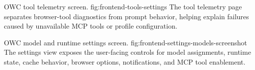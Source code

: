   {OWC tool telemetry screen.}
  {fig:frontend-tools-settings}
  {The tool telemetry page separates browser-tool diagnostics from prompt behavior, helping
  explain failures caused by unavailable MCP tools or profile configuration.}

  {OWC model and runtime settings screen.}
  {fig:frontend-settings-models-screenshot}
  {The settings view exposes the user-facing controls for model assignments, runtime state,
  cache behavior, browser options, notifications, and MCP tool enablement.}
